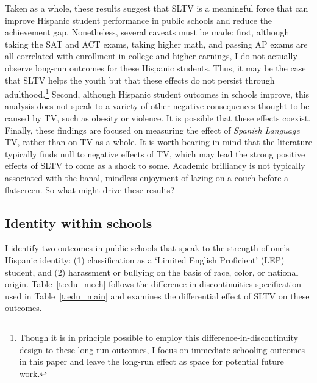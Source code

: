 \documentclass[11pt]{article}
\begin{document}
Taken as a whole, these results suggest that SLTV is a meaningful force that can improve Hispanic student performance in public schools and reduce the achievement gap. Nonetheless, several caveats must be made: first, although taking the SAT and ACT exams, taking higher math, and passing AP exams are all correlated with enrollment in college and higher earnings, I do not actually observe long-run outcomes for these Hispanic students. Thus, it may be the case that SLTV helps the youth but that these effects do not persist through adulthood.\footnote{ Though it is in principle possible to employ this difference-in-discontinuity design to these long-run outcomes, I focus on immediate schooling outcomes in this paper and leave the long-run effect as space for potential future work.} Second, although Hispanic student outcomes in schools improve, this analysis does not speak to a variety of other negative consequences thought to be caused by TV, such as obesity or violence. It is possible that these effects coexist. Finally, these findings are focused on measuring the effect of \textit{Spanish Language} TV, rather than on TV as a whole. It is worth bearing in mind that the literature typically finds null to negative effects of TV, which may lead the strong positive effects of SLTV to come as a shock to some. Academic brilliancy is not typically associated with the banal, mindless enjoyment of lazing on a couch before a flatscreen. So what might drive these results?

\subsection{Identity within schools}

I identify two outcomes in public schools that speak to the strength of one's Hispanic identity: (1) classification as a `Limited English Proficient' (LEP) student, and (2) harassment or bullying on the basis of race, color, or national origin. Table~\ref{t:edu_mech} follows the difference-in-discontinuities specification used in Table~\ref{t:edu_main} and examines the differential effect of SLTV on these outcomes.
\end{document}
